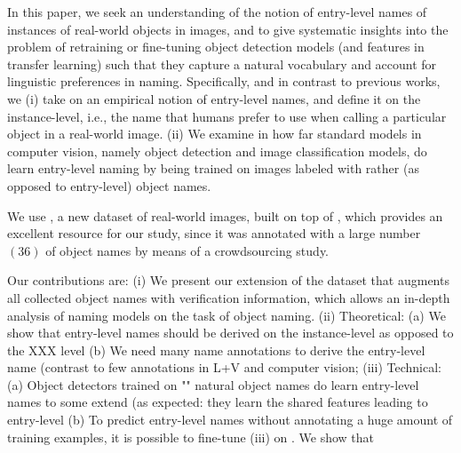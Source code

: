 %
In this paper, we seek an understanding of the notion of entry-level names of instances of real-world objects in images, and to give systematic insights into the problem of retraining or fine-tuning object detection models (and features in transfer learning) such that they capture a natural vocabulary and account for linguistic preferences in naming. %
Specifically, and in contrast to previous works, we 
(i) take on an empirical notion of entry-level names, and define it on the instance-level, i.e., the name that humans prefer to use when calling a particular object in a real-world image.   
(ii) We examine in how far standard models in computer vision, namely object detection and image classification models, do learn entry-level naming by being trained on images labeled with rather \textit{\arbitrary} (as opposed to entry-level) object names. 

We use \mn, a new dataset of real-world images, built on top of \vg, which provides an excellent resource for our study, since it was  annotated with a large number\ $(36)$ of object names by means of a crowdsourcing study.

Our contributions are: 
(i) We present our extension of the \mn dataset that augments all collected object names with verification information, which allows an in-depth analysis of naming models on the task of object naming. 
(ii) Theoretical:
(a) We show that entry-level names should be derived on the instance-level as opposed to the XXX level 
(b) We need many name annotations to derive the entry-level name (contrast to few annotations in L+V and computer vision; 
(iii) Technical:
(a) Object detectors trained on "\arbitrary" natural object names do learn entry-level names to some extend (as expected: they learn the shared features leading to entry-level 
(b) To predict entry-level names without annotating a huge amount of training examples, it is possible to fine-tune (iii) on \mn. We show that 

